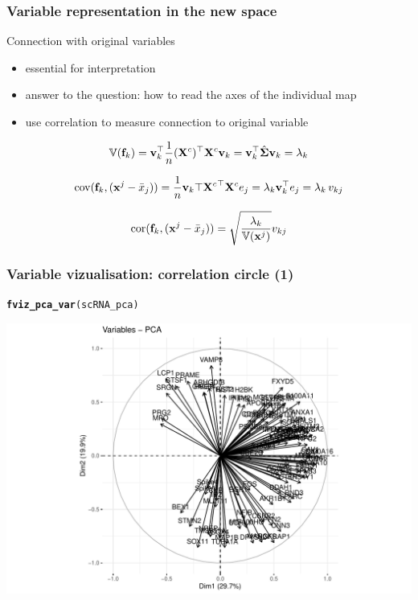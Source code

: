 \documentclass{beamer}\usepackage[]{graphicx}\usepackage[]{color}
\makeatletter
\newcommand{\hlstd}[1]{\textcolor[rgb]{0.345,0.345,0.345}{#1}}%
\newcommand{\hlkwd}[1]{\textcolor[rgb]{0.737,0.353,0.396}{\textbf{#1}}}%
\newenvironment{kframe}{%
 \def\at@end@of@kframe{}%
 \ifinner\ifhmode%
  \def\at@end@of@kframe{\end{minipage}}%
  \begin{minipage}{\columnwidth}%
 \fi\fi%
 \def\FrameCommand##1{\hskip\@totalleftmargin \hskip-\fboxsep
 \colorbox{shadecolor}{##1}\hskip-\fboxsep
     \hskip-\linewidth \hskip-\@totalleftmargin \hskip\columnwidth}%
 \MakeFramed {\advance\hsize-\width
   \@totalleftmargin\z@ \linewidth\hsize
   \@setminipage}}%
 {\par\unskip\endMakeFramed%
 \at@end@of@kframe}
\newenvironment{knitrout}{}{} %
\makeatother
\begin{document}
\begin{frame}
  \frametitle{Variable representation in the new space}
  
  \begin{block}{Connection with original variables}
    \begin{itemize}
      \item essential for interpretation
      \item answer to the question: how to read the axes of the individual map
      \item use correlation to measure connection to original variable
    \end{itemize}
  \end{block}

  \begin{equation*}
    \mathbb{V}(\mathbf{f}_k) = \mathbf{v}_k^\top \frac{1}{n}(\mathbf{X}^c)^\top \mathbf{X}^c \mathbf{v}_k =  \mathbf{v}_k^\top \hat{\boldsymbol{\Sigma}} \mathbf{v}_k = \lambda_k
  \end{equation*}
  
  \begin{equation*}
    \mathrm{cov}(\mathbf{f}_k, (\mathbf{x}^j - \bar{x}_j)) = \frac{1}{n}\mathbf{v}_k \top {\mathbf{X}^c}^\top \mathbf{X}^c e_j =  \lambda_k \mathbf{v}_k^\top e_j = \lambda_k \, v_{kj}   
  \end{equation*}

  \begin{equation*}
    \mathrm{cor}(\mathbf{f}_k, (\mathbf{x}^j - \bar{x}_j)) =  \sqrt{\frac{\lambda_k}{\mathbb{V}(\mathbf{x}^j)}} v_{kj}
  \end{equation*}
  
\end{frame}

\begin{frame}[fragile]
  \frametitle{Variable vizualisation: correlation circle (1)}

\begin{knitrout}\scriptsize
{}\color{fgcolor}\begin{kframe}
\begin{alltt}
\hlkwd{fviz_pca_var}\hlstd{(scRNA_pca)}
\end{alltt}
\end{kframe}
\includegraphics[width=.8\textwidth]{figures/pca_crabs_varmap1-1} 
\end{knitrout}

\end{frame}
\end{document}
